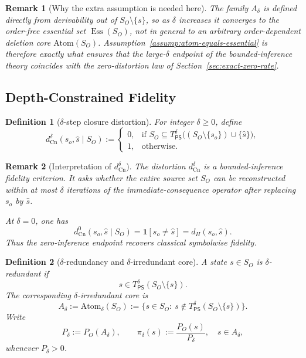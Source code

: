\documentclass[journal,onecolumn]{IEEEtran}
\newcommand{\Atom}{\text{Atom}}
\newcommand{\Cn}{\text{Cn}}
\newcommand{\Ess}{\operatorname{Ess}}
\newtheorem{definition}{Definition}[section]
\newtheorem{remark}{Remark}[section]
\numberwithin{equation}{section}
\begin{document}
\begin{remark}[Why the extra assumption is needed here]
\label{rem:why-extra-assumption-limited-inference}
The family \(A_\delta\) is defined directly from derivability out of
\(S_O\setminus\{s\}\), so as \(\delta\) increases it converges to the
order-free essential set \(\Ess(S_O)\), not in general to an
arbitrary order-dependent deletion core \(\Atom(S_O)\).
Assumption~\ref{assump:atom-equals-essential} is therefore exactly
what ensures that the large-\(\delta\) endpoint of the
bounded-inference theory coincides with the zero-distortion law of
Section~\ref{sec:exact-zero-rate}.
\end{remark}

\subsection{Depth-Constrained Fidelity}
\label{subsec:delta-distortion}

\begin{definition}[\(\delta\)-step closure distortion]
\label{def:delta-closure-distortion}
For integer \(\delta\ge 0\), define
\begin{equation}\label{eq:d-Cn-delta}
  d_{\Cn}^{\delta}(s_o,\hat s\mid S_O)
  :=
  \begin{cases}
    0, &
    \text{if } S_O\subseteq
    T_{\mathsf{PS}}^\delta\bigl((S_O\setminus\{s_o\})\cup
    \{\hat s\}\bigr),\\[4pt]
    1, & \text{otherwise}.
  \end{cases}
\end{equation}
\end{definition}

\begin{remark}[Interpretation of \(d_{\Cn}^{\delta}\)]
\label{rem:dCn-delta-interpretation}
The distortion \(d_{\Cn}^{\delta}\) is a bounded-inference
fidelity criterion.
It asks whether the entire source set \(S_O\) can be
reconstructed within at most \(\delta\) iterations of the
immediate-consequence operator after replacing \(s_o\) by
\(\hat s\).

At \(\delta=0\), one has
\[
  d_{\Cn}^{0}(s_o,\hat s\mid S_O)=\mathbf{1}[s_o\neq\hat s]
  =d_H(s_o,\hat s).
\]
Thus the zero-inference endpoint recovers classical symbolwise
fidelity.
\end{remark}

\begin{definition}[\(\delta\)-redundancy and
\(\delta\)-irredundant core]
\label{def:delta-core}
A state \(s\in S_O\) is \emph{\(\delta\)-redundant} if
\[
  s\in T_{\mathsf{PS}}^\delta(S_O\setminus\{s\}).
\]
The corresponding \emph{\(\delta\)-irredundant core} is
\[
  A_\delta
  :=
  \Atom_\delta(S_O)
  :=
  \{s\in S_O:\ s\notin
  T_{\mathsf{PS}}^\delta(S_O\setminus\{s\})\}.
\]
Write
\[
  P_\delta:=P_O(A_\delta),
  \qquad
  \pi_\delta(s):=\frac{P_O(s)}{P_\delta},
  \quad s\in A_\delta,
\]
whenever \(P_\delta>0\).
\end{definition}
\end{document}

